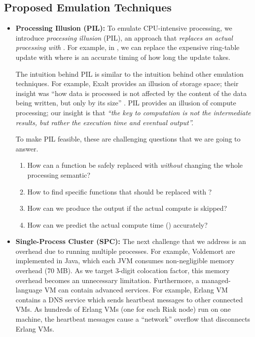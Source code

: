 \subsection{Proposed Emulation Techniques}

\begin{itemize}

\item {\bf Processing Illusion (PIL):}
%
To emulate CPU-intensive processing, we introduce {\em processing
illusion} (PIL), an approach that {\em replaces an actual processing
with \sleep}.  For example, in \caone, we can replace the expensive
ring-table update with  where  is an accurate timing of
how long the update takes.

The intuition behind PIL is similar to the intuition behind other emulation
techniques.
%
For example, Exalt provides an illusion of storage space; their insight was
``how data is processed is  not affected by the content of the data being
written, but only by its size'' \cite{Wang+14-Exalt}.
%
PIL provides an illusion of compute processing; our insight is that {\em ``the
key to computation is not the intermediate results, but rather the execution
time and eventual output''.}

To make PIL feasible, these are challenging questions that we are going to
answer.

\begin{enumerate}

\item How can a function be safely replaced with \sleep \textit{without}
changing the whole processing semantic?
 
\item How to find specific functions that should be replaced with \sleep?
 
\item How can we produce the output if the actual compute is skipped?
 
\item How can we predict the actual compute time () accurately?

\end{enumerate}


\item {\bf Single-Process Cluster (SPC):} The next challenge that we address is
an overhead due to running multiple processes. For example, Voldemort
\cite{VoldemortWeb} are implemented in Java, which each JVM consumes
non-negligible memory overhead (70 MB). As we target 3-digit colocation factor,
this memory overhead becomes an unnecessary limitation.
%
Furthermore, a managed-language VM can contain advanced services.  For example,
Erlang VM contains a DNS service which sends heartbeat messages to other
connected VMs.  As hundreds of Erlang VMs (one for each Riak node) run on one
machine, the heartbeat messages cause a ``network'' overflow that disconnects
Erlang VMs.


\end{itemize}
